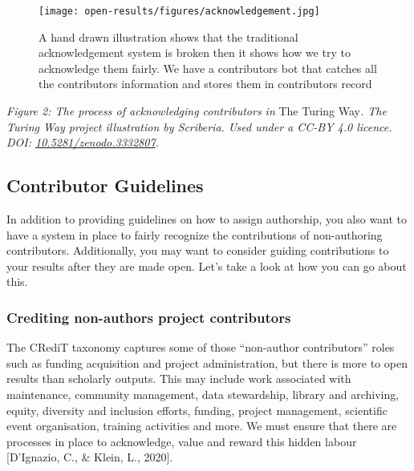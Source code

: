 \documentclass[
  letterpaper,
  DIV=11,
  numbers=noendperiod]{scrreport}
\begin{document}
\begin{figure}

{\centering \texttt{[image: open-results/figures/acknowledgement.jpg]}

}

\caption{A hand drawn illustration shows that the traditional
acknowledgement system is broken then it shows how we try to acknowledge
them fairly. We have a contributors bot that catches all the
contributors information and stores them in contributors record}

\end{figure}

\emph{Figure 2: The process of acknowledging contributors in }The Turing
Way\emph{. \emph{The Turing Way} project illustration by Scriberia. Used
under a CC-BY 4.0 licence. DOI:
\href{https://doi.org/10.5281/zenodo.3332807}{10.5281/zenodo.3332807}.}

\hypertarget{contributor-guidelines}{%
\subsection{Contributor Guidelines}\label{contributor-guidelines}}

In addition to providing guidelines on how to assign authorship, you
also want to have a system in place to fairly recognize the
contributions of non-authoring contributors. Additionally, you may want
to consider guiding contributions to your results after they are made
open. Let's take a look at how you can go about this.

\hypertarget{crediting-non-authors-project-contributors}{%
\subsubsection{Crediting non-authors project
contributors}\label{crediting-non-authors-project-contributors}}

The CRediT taxonomy captures some of those ``non-author contributors''
roles such as funding acquisition and project administration, but there
is more to open results than scholarly outputs. This may include work
associated with maintenance, community management, data stewardship,
library and archiving, equity, diversity and inclusion efforts, funding,
project management, scientific event organisation, training activities
and more. We must ensure that there are processes in place to
acknowledge, value and reward this hidden labour {[}D'Ignazio, C., \&
Klein, L., 2020{]}.
\end{document}
